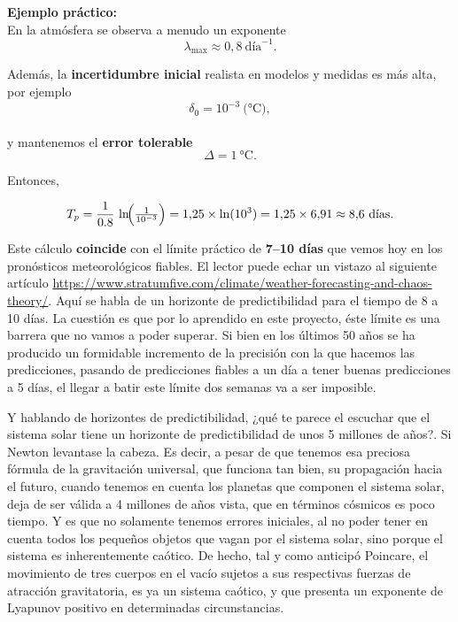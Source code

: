 \documentclass[
  10pt,
  a4paper,
  DIV=11,
  numbers=noendperiod,
  open=any]{scrreprt}
\numberwithin{equation}{chapter}
\numberwithin{equation}{section}
\renewcommand{\[}{\begin{equation}}
\renewcommand{\]}{\end{equation}}
\begin{document}
\textbf{Ejemplo práctico:}\\
En la atmósfera se observa a menudo un exponente\\
\[
\lambda_{\max} \approx 0{,}8\ \text{día}^{-1}.
\]

Además, la \textbf{incertidumbre inicial} realista en modelos y medidas
es más alta, por ejemplo\\
\[
\delta_0 = 10^{-3}\ \text{(°C)},
\]\\
y mantenemos el \textbf{error tolerable}\\
\[
\Delta = 1\ \text{°C}.
\]

Entonces,

\begin{equation}
T_p
= \frac{1}{0.8}\,\ln\!\Bigl(\tfrac{1}{10^{-3}}\Bigr)
=1{,}25 \times \ln(10^3)
=1{,}25 \times 6{,}91
\approx 8{,}6\ \text{días}.
\end{equation}

Este cálculo \textbf{coincide} con el límite práctico de \textbf{7--10
días} que vemos hoy en los pronósticos meteorológicos fiables. El lector
puede echar un vistazo al siguiente artículo \url{https://www.stratumfive.com/climate/weather-forecasting-and-chaos-theory/}. Aquí se habla de un horizonte de predictibilidad para el tiempo de 8 a
10 días. La cuestión es que por lo aprendido en este proyecto, éste
límite es una barrera que no vamos a poder superar. Si bien en los
últimos 50 años se ha producido un formidable incremento de la precisión
con la que hacemos las predicciones, pasando de predicciones fiables a
un día a tener buenas predicciones a 5 días, el llegar a batir este
límite dos semanas va a ser imposible.

Y hablando de horizontes de predictibilidad, ¿qué te parece el escuchar
que el sistema solar tiene un horizonte de predictibilidad de unos 5
millones de años?. Si Newton levantase la cabeza. Es decir, a pesar de
que tenemos esa preciosa fórmula de la gravitación universal, que
funciona tan bien, su propagación hacia el futuro, cuando tenemos en
cuenta los planetas que componen el sistema solar, deja de ser válida a
4 millones de años vista, que en términos cósmicos es poco tiempo. Y es
que no solamente tenemos errores iniciales, al no poder tener en cuenta
todos los pequeños objetos que vagan por el sistema solar, sino porque
el sistema es inherentemente caótico. De hecho, tal y como anticipó
Poincare, el movimiento de tres cuerpos en el vacío sujetos a sus
respectivas fuerzas de atracción gravitatoria, es ya un sistema caótico,
y que presenta un exponente de Lyapunov positivo en determinadas
circunstancias.
\end{document}
